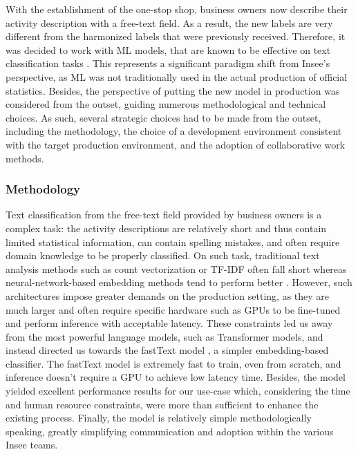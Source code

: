 With the establishment of the one-stop shop, business owners now describe their activity description with a free-text field. As a result, the new labels are very different from the harmonized labels that were previously received. Therefore, it was decided to work with ML models, that are known to be effective on text classification tasks \cite{li2022survey}. This represents a significant paradigm shift from Insee's perspective, as ML was not traditionally used in the actual production of official statistics. Besides, the perspective of putting the new model in production was considered from the outset, guiding numerous methodological and technical choices. As such, several strategic choices had to be made from the outset, including the methodology, the choice of a development environment consistent with the target production environment, and the adoption of collaborative work methods.

\subsubsection{Methodology}

Text classification from the free-text field provided by business owners is a complex task: the activity descriptions are relatively short and thus contain limited statistical information, can contain spelling mistakes, and often require domain knowledge to be properly classified. On such task, traditional text analysis methods such as count vectorization or TF-IDF often fall short whereas neural-network-based embedding methods tend to perform better \cite{li2022survey}. However, such architectures impose greater demands on the production setting, as they are much larger and often require specific hardware such as GPUs to be fine-tuned and perform inference with acceptable latency. These constraints led us away from the most powerful language models, such as Transformer models, and instead directed us towards the fastText model \cite{joulin2016bag}, a simpler embedding-based classifier. The fastText model is extremely fast to train, even from scratch, and inference doesn't require a GPU to achieve low latency time. Besides, the model yielded excellent performance results for our use-case which, considering the time and human resource constraints, were more than sufficient to enhance the existing process. Finally, the model is relatively simple methodologically speaking, greatly simplifying communication and adoption within the various Insee teams. 

